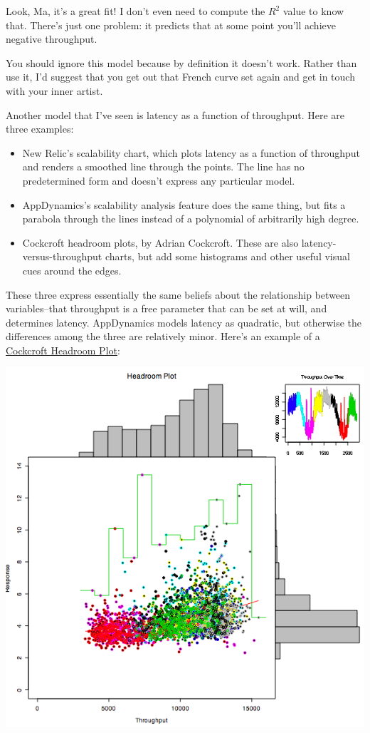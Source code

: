 \documentclass{vivid_layout}
\begin{document}
Look, Ma, it's a great fit! I don't even need to compute the $R^2$ value to know
that. There's just one problem: it predicts that at some point you'll achieve
negative throughput.

You should ignore this model because by definition it doesn't work. Rather than
use it, I'd suggest that you get out that French curve set again and get in
touch with your inner artist.

Another model that I've seen is latency as a function of throughput. Here
are three examples:

\begin{itemize}
\item New Relic's scalability chart, which plots latency as a function of
throughput and renders a smoothed line through the points. The line has no
predetermined form and doesn't express any particular model.
\item AppDynamics's scalability analysis feature does the same thing, but fits a
parabola through the lines instead of a polynomial of arbitrarily high degree.
\item Cockcroft headroom plots, by Adrian Cockcroft. These are also
latency-versus-throughput charts, but add some histograms and other useful
visual cues around the edges.
\end{itemize}

These three express essentially the same beliefs about the relationship between
variables--that throughput is a free parameter that can be set at will, and
determines latency.  AppDynamics models latency as quadratic, but otherwise
the differences among the three are relatively minor. Here's an example of a
\href{http://perfcap.blogspot.nl/2008/07/enhanced-headroom-plot-in-r.html}{Cockcroft
Headroom Plot}:
\begin{center}
\includegraphics[width=.60\linewidth]{scalability/chpblog3}
\end{center}
\end{document}

